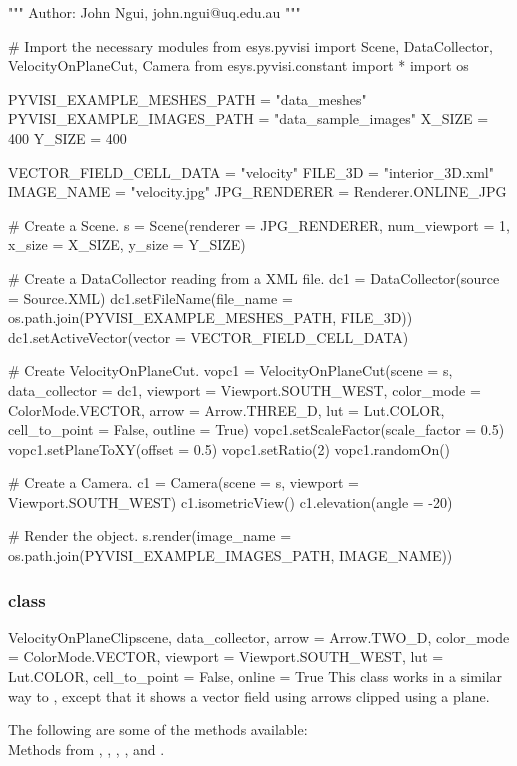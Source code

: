 \begin{python}
"""
Author: John Ngui, john.ngui@uq.edu.au
"""

# Import the necessary modules
from esys.pyvisi import Scene, DataCollector, VelocityOnPlaneCut, Camera
from esys.pyvisi.constant import *
import os

PYVISI_EXAMPLE_MESHES_PATH = "data_meshes"
PYVISI_EXAMPLE_IMAGES_PATH = "data_sample_images"
X_SIZE = 400
Y_SIZE = 400

VECTOR_FIELD_CELL_DATA = "velocity"
FILE_3D = "interior_3D.xml"
IMAGE_NAME = "velocity.jpg"
JPG_RENDERER = Renderer.ONLINE_JPG

# Create a Scene.
s = Scene(renderer = JPG_RENDERER, num_viewport = 1, x_size = X_SIZE, 
        y_size = Y_SIZE)

# Create a DataCollector reading from a XML file.
dc1 = DataCollector(source = Source.XML)
dc1.setFileName(file_name = os.path.join(PYVISI_EXAMPLE_MESHES_PATH, FILE_3D))
dc1.setActiveVector(vector = VECTOR_FIELD_CELL_DATA)

# Create VelocityOnPlaneCut.
vopc1 = VelocityOnPlaneCut(scene = s, data_collector = dc1, 
        viewport = Viewport.SOUTH_WEST, color_mode = ColorMode.VECTOR, 
        arrow = Arrow.THREE_D, lut = Lut.COLOR, cell_to_point = False, 
        outline = True)
vopc1.setScaleFactor(scale_factor = 0.5)
vopc1.setPlaneToXY(offset = 0.5)
vopc1.setRatio(2)
vopc1.randomOn()

# Create a Camera.
c1 = Camera(scene = s, viewport = Viewport.SOUTH_WEST)
c1.isometricView()
c1.elevation(angle = -20)

# Render the object.
s.render(image_name = os.path.join(PYVISI_EXAMPLE_IMAGES_PATH, IMAGE_NAME))
\end{python}

\subsubsection{\VelocityOnPlaneClip class}

\begin{classdesc}{VelocityOnPlaneClip}{scene, data_collector, 
arrow = Arrow.TWO_D, color_mode = ColorMode.VECTOR, 
viewport = Viewport.SOUTH_WEST, lut = Lut.COLOR, 
cell_to_point = False, online = True}
This class works in a similar way to \MapOnPlaneClip, except that it shows a 
vector field using arrows clipped using a plane. 
\end{classdesc}

The following are some of the methods available:\\
Methods from \ActorThreeD, \GlyphThreeD, \Transform, \Clipper, 
\MaskPoints and \DataSetMapper. 

